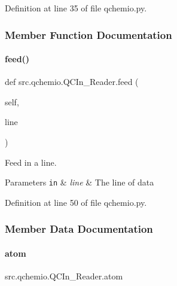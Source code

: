 Definition at line 35 of file qchemio.\+py.



\subsubsection{Member Function Documentation}
\mbox{\label{classsrc_1_1qchemio_1_1QCIn__Reader_a21931c7c857f2497bdf3c4031a464ddf}} 
\paragraph{\texorpdfstring{feed()}{feed()}}
{\footnotesize\ttfamily def src.\+qchemio.\+Q\+C\+In\+\_\+\+Reader.\+feed (\begin{DoxyParamCaption}\item[{}]{self,  }\item[{}]{line }\end{DoxyParamCaption})}



Feed in a line. 


\begin{DoxyParams}[1]{Parameters}
\mbox{\tt in}  & {\em line} & The line of data \\
\hline
\end{DoxyParams}


Definition at line 50 of file qchemio.\+py.



\subsubsection{Member Data Documentation}
\mbox{\label{classsrc_1_1qchemio_1_1QCIn__Reader_a05c4ce2f859233dece0971c87650cd37}} 
\paragraph{\texorpdfstring{atom}{atom}}
{\footnotesize\ttfamily src.\+qchemio.\+Q\+C\+In\+\_\+\+Reader.\+atom}



